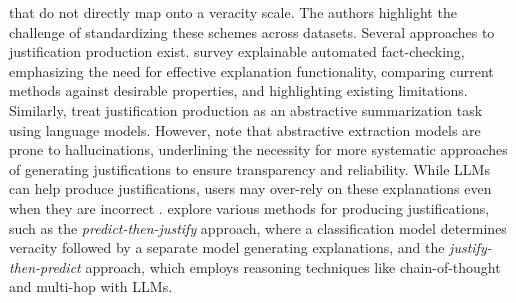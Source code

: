 that do not directly map onto a veracity scale. The authors highlight the challenge of standardizing these schemes across datasets. Several approaches to justification production exist. \citet{kotonya2020ExplainableAutomatedFactChecking} survey explainable automated fact-checking, emphasizing the need for effective explanation functionality, comparing current methods against desirable properties, and highlighting existing limitations. Similarly, \citet{russo2023BenchmarkingGenerationFact} treat justification production as an abstractive summarization task using language models. However, \citet{maynez2020FaithfulnessFactualityAbstractive} note that abstractive extraction models are prone to hallucinations, underlining the necessity for more systematic approaches of generating justifications to ensure transparency and reliability. While LLMs can help produce justifications, users may over-rely on these explanations even when they are incorrect \cite{si2024LargeLanguageModels}. \citet{eldifrawi2024AutomatedJustificationProduction} explore various methods for producing justifications, such as the \textit{predict-then-justify} approach, where a classification model determines veracity followed by a separate model generating explanations, and the \textit{justify-then-predict} approach, which employs reasoning techniques like chain-of-thought \cite{pan2023FactCheckingComplexClaims} and multi-hop \cite{wang2023ExplainableClaimVerification} with LLMs.